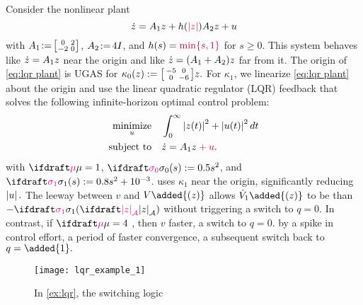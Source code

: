 \begin{example}[LQR]
    \label{ex:lqr}
    Consider the nonlinear plant
    \begin{equation}
        \dot{z} = A_1 z + h({\color{purple}\left\lvert z\right\rvert}) A_2 z + u
        \label{eq:lqr plant}
    \end{equation}
    with $\squeezespaces{0.5}A_1 := \smallmat{0 & 2 \\ -2 & 0}$, 
    $\squeezespaces{0.5}A_2 := 4I$,
    and $h(s) = {\color{purple}\min\{s, 1\}}$ for $s \geq 0$.
    This system behaves like $\dot{z} = A_1z$ near the origin and 
    like $\dot{z} = (A_1+A_2)z$ far from it.
    The origin of \cref{eq:lqr plant} is UGAS for
    $\kappa_0(z) := \bigl[ \begin{smallmatrix} -5 & 0 \\ 0 & -6 \end{smallmatrix} \bigr]z.$ 
    For $\kappa_1$, we linearize \cref{eq:lqr plant} about the origin
    and use the linear quadratic regulator (LQR) feedback that solves
    the following infinite-horizon optimal control problem:
    \begin{equation}
        \begin{aligned}
            \underset{u}{\textup{minimize}}\quad & \int_0^\infty \left\lvert z(t)\right\rvert^2 + \left\lvert u(t)\right\rvert^2 \mathop{}\!d t \\
            \textup{subject to}\quad & \dot{z} = A_1z {\color{purple}{} + u}.
        \end{aligned}
        \label{eq:lqr problem}
    \end{equation}
     
    with $\squeezespaces{1.0}\vdiffcoeff = 1$, $\squeezespaces{1.0}\sigmazero(s) := 0.5s^2$, 
    and $\squeezespaces{1.0}\sigmaone(s) := 0.8s^2 + 10^{-3}$.
    uses $\kappa_1$ near the origin, 
    significantly reducing $\left\lvert u\right\rvert.$ The leeway between $v$ and $V\added{(z)}$ 
    allows $\dot V_1\added{(z)}$ to be  than $-\sigmaone(\distA{z})$ without
    triggering a switch to $q=0.$ 
    In contrast, if $\vdiffcoeff =  4$ , 
    then $v$  faster,
     a switch to $q=0$.
     by a spike in control 
    effort, a period of faster convergence, 
    a subsequent switch back to $q=\added{1}.$
    \begin{figure}[htbp]
        \centering
        \texttt{[image: lqr\_example\_1]}
        \setlength{\belowcaptionskip}{-14pt}
        \caption{In \cref{ex:lqr}, the switching logic 
}
\end{figure}
\end{example}
